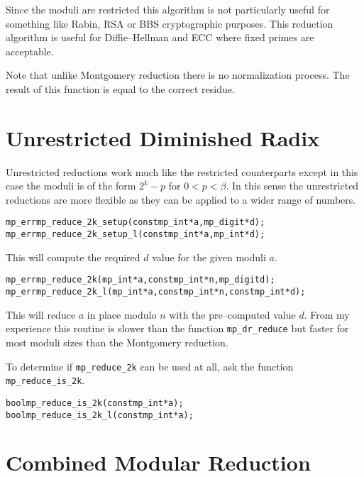 \documentclass[synpaper]{book}
\begin{document}
Since the moduli are restricted this algorithm is not particularly useful for something like Rabin,
RSA or BBS cryptographic purposes.  This reduction algorithm is useful for Diffie--Hellman and ECC
where fixed primes are acceptable.

Note that unlike Montgomery reduction there is no normalization process.  The result of this
function is equal to the correct residue.

\section{Unrestricted Diminished Radix}

Unrestricted reductions work much like the restricted counterparts except in this case the moduli
is of the form $2^k - p$ for $0 < p < \beta$. In this sense the unrestricted reductions are more
flexible as they can be applied to a wider range of numbers.

\begin{alltt}
mp_err mp_reduce_2k_setup(const mp_int *a, mp_digit *d);
mp_err mp_reduce_2k_setup_l(const mp_int *a, mp_int *d);
\end{alltt}

This will compute the required $d$ value for the given moduli $a$.

\begin{alltt}
mp_err mp_reduce_2k(mp_int *a, const mp_int *n, mp_digit d);
mp_err mp_reduce_2k_l(mp_int *a, const mp_int *n, const mp_int *d);
\end{alltt}

This will reduce $a$ in place modulo $n$ with the pre--computed value $d$.  From my experience this
routine is slower than the function \texttt{mp\_dr\_reduce} but faster for most moduli sizes than
the Montgomery reduction.

To determine if \texttt{mp\_reduce\_2k} can be used at all, ask the function
\texttt{mp\_reduce\_is\_2k}.

\begin{alltt}
bool mp_reduce_is_2k(const mp_int *a);
bool mp_reduce_is_2k_l(const mp_int *a);
\end{alltt}

\section{Combined Modular Reduction}
\end{document}
